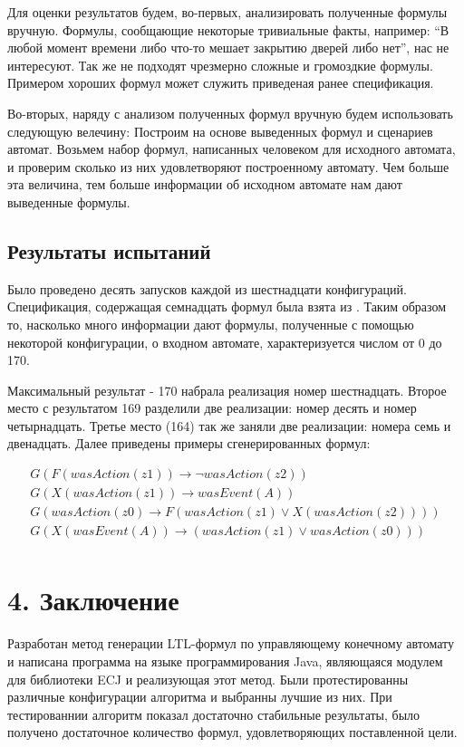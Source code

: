 \documentclass[12pt,fleqn]{article}
\begin{document}
Для оценки результатов будем, во-первых, анализировать полученные формулы вручную. Формулы, сообщающие некоторые тривиальные
факты, например: ``В любой момент времени либо что-то мешает закрытию дверей либо нет'', нас не интересуют.
Так же не подходят чрезмерно сложные и громоздкие формулы. Примером хороших формул может служить приведеная ранее спецификация.

Во-вторых, наряду с анализом полученных формул вручную будем использовать следующую велечину:
Построим на основе выведенных формул и сценариев автомат. Возьмем набор формул, написанных человеком для исходного автомата, и
проверим сколько из них удовлетворяют построенному автомату. Чем больше эта величина, тем больше информации об исходном
автомате нам дают выведенные формулы.

\subsection*{Результаты испытаний}

Было проведено десять запусков каждой из шестнадцати конфигураций. Спецификация, содержащая семнадцать формул была взята из \cite{eg}.
Таким образом то, насколько много информации дают формулы, полученные с помощью некоторой конфигурации, о входном автомате,
характеризуется числом от 0 до 170.

Максимальный результат - 170 набрала реализация номер шестнадцать. Второе место с результатом 169 разделили две реализации:
номер десять и номер четырнадцать. Третье место (164) так же заняли две реализации: номера семь и двенадцать.
Далее приведены примеры сгенерированных формул: 

\begin{multline*}
G(F(wasAction(z1)) \rightarrow \lnot wasAction(z2))\\
G(X(wasAction(z1)) \rightarrow wasEvent(A))\\
G(wasAction(z0) \rightarrow F(wasAction(z1) \vee X(wasAction(z2))))\\
G(X(wasEvent(A)) \rightarrow (wasAction(z1) \vee wasAction(z0)))\\
\end{multline*}

\section*{4. Заключение}

Разработан метод генерации LTL-формул по управляющему конечному автомату и написана программа на языке программирования Java,
являющаяся модулем для библиотеки ECJ и реализующая этот метод. Были протестированны различные конфигурации алгоритма и
выбранны лучшие из них. При тестированнии алгоритм показал достаточно стабильные результаты, было получено достаточное
количество формул, удовлетворяющих поставленной цели.
\end{document}
